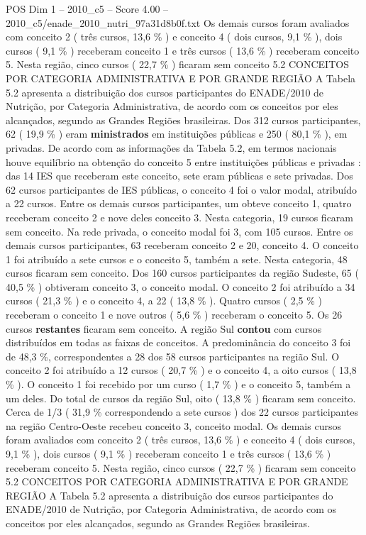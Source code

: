 \begin{textsample}{POS Dim 1 – 2010\_c5 – Score 4.00 – 2010\_c5/enade\_2010\_nutri\_97a31d8b0f.txt}
Os demais cursos foram avaliados com conceito 2 ( três cursos, 13,6 \% ) e conceito 4 ( dois cursos, 9,1 \% ), dois cursos ( 9,1 \% ) receberam conceito 1 e três cursos ( 13,6 \% ) receberam conceito 5.
Nesta região, cinco cursos ( 22,7 \% ) ficaram sem conceito 5.2 CONCEITOS POR CATEGORIA ADMINISTRATIVA E POR GRANDE REGIÃO A Tabela 5.2 apresenta a distribuição dos cursos participantes do ENADE/2010 de Nutrição, por Categoria Administrativa, de acordo com os conceitos por eles alcançados, segundo as Grandes Regiões brasileiras.
Dos 312 cursos participantes, 62 ( 19,9 \% ) eram \textbf{ministrados} em instituições públicas e 250 ( 80,1 \% ), em privadas.
De acordo com as informações da Tabela 5.2, em termos nacionais houve equilíbrio na obtenção do conceito 5 entre instituições públicas e privadas : das 14 IES que receberam este conceito, sete eram públicas e sete privadas.
Dos 62 cursos participantes de IES públicas, o conceito 4 foi o valor modal, atribuído a 22 cursos.
Entre os demais cursos participantes, um obteve conceito 1, quatro receberam conceito 2 e nove deles conceito 3.
Nesta categoria, 19 cursos ficaram sem conceito.
Na rede privada, o conceito modal foi 3, com 105 cursos.
Entre os demais cursos participantes, 63 receberam conceito 2 e 20, conceito 4.
O conceito 1 foi atribuído a sete cursos e o conceito 5, também a sete.
Nesta categoria, 48 cursos ficaram sem conceito.
Dos 160 cursos participantes da região Sudeste, 65 ( 40,5 \% ) obtiveram conceito 3, o conceito modal.
O conceito 2 foi atribuído a 34 cursos ( 21,3 \% ) e o conceito 4, a 22 ( 13,8 \% ).
Quatro cursos ( 2,5 \% ) receberam o conceito 1 e nove outros ( 5,6 \% ) receberam o conceito 5.
Os 26 cursos \textbf{restantes} ficaram sem conceito.
A região Sul \textbf{contou} com cursos distribuídos em todas as faixas de conceitos.
A predominância do conceito 3 foi de 48,3 \%, correspondentes a 28 dos 58 cursos participantes na região Sul.
O conceito 2 foi atribuído a 12 cursos ( 20,7 \% ) e o conceito 4, a oito cursos ( 13,8 \% ).
O conceito 1 foi recebido por um curso ( 1,7 \% ) e o conceito 5, também a um deles.
Do total de cursos da região Sul, oito ( 13,8 \% ) ficaram sem conceito.
Cerca de 1/3 ( 31,9 \% correspondendo a sete cursos ) dos 22 cursos participantes na região Centro-Oeste recebeu conceito 3, conceito modal.
Os demais cursos foram avaliados com conceito 2 ( três cursos, 13,6 \% ) e conceito 4 ( dois cursos, 9,1 \% ), dois cursos ( 9,1 \% ) receberam conceito 1 e três cursos ( 13,6 \% ) receberam conceito 5.
Nesta região, cinco cursos ( 22,7 \% ) ficaram sem conceito 5.2 CONCEITOS POR CATEGORIA ADMINISTRATIVA E POR GRANDE REGIÃO A Tabela 5.2 apresenta a distribuição dos cursos participantes do ENADE/2010 de Nutrição, por Categoria Administrativa, de acordo com os conceitos por eles alcançados, segundo as Grandes Regiões brasileiras.

\end{textsample}
